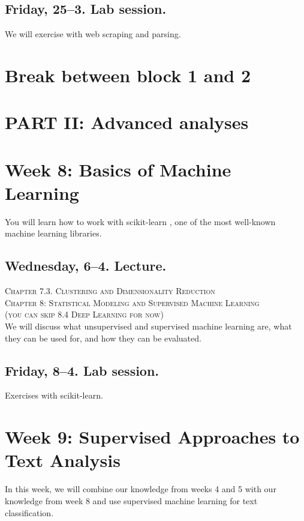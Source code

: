 \subsection*{Friday, 25--3. Lab session.}
We will exercise with web scraping and parsing.







\section*{Break between block 1 and 2}

\section*{PART II: Advanced analyses}


\section*{Week 8: Basics of Machine Learning}
You will learn how to work with scikit-learn \citep{scikit-learn}, one of the most well-known machine learning libraries.


\subsection*{Wednesday, 6--4. Lecture.}
\textsc{ Chapter 7.3. Clustering and Dimensionality Reduction}\\
\textsc{ Chapter 8: Statistical Modeling and Supervised Machine Learning}\\
\textsc{ (you can skip 8.4 Deep Learning for now)}\\

We will discuss what unsupervised and supervised machine learning are, what they can be used for, and how they can be evaluated.


\subsection*{Friday, 8--4. Lab session.}
Exercises with scikit-learn.


\section*{Week 9: Supervised Approaches to Text Analysis}
In this week, we will combine our knowledge from weeks 4 and 5 with our knowledge from week 8 and use supervised machine learning for text classification.

